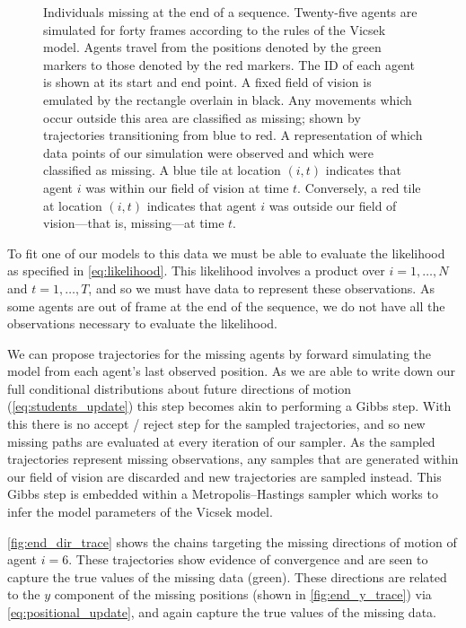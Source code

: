 \begin{figure}[tbp]
\begin{subfigure}[b]{0.5\textwidth}
    \caption{}
    \label{subfig:end_missing}
  \end{subfigure}
  \caption{Individuals missing at the end of a sequence.
   Twenty-five agents are simulated for forty frames
  according to the rules of the Vicsek model. Agents travel from the positions
  denoted by the green markers to those denoted by the red markers. The ID of
  each agent is shown at its start and end point. A fixed field of vision is
  emulated by the rectangle overlain in black. Any movements which occur
  outside this area are classified as missing; shown by trajectories
  transitioning from blue to red.
   A representation of which data points of our
  simulation were observed and which were classified as missing. A blue tile at
  location $(i, t)$ indicates that agent $i$ was within our field of vision at
  time $t$. Conversely, a red tile at location $(i, t)$ indicates that agent
  $i$ was outside our field of vision---that is, missing---at time $t$.}
  \label{fig:end_data}
\end{figure}

To fit one of our models to this data we must be able to evaluate the
likelihood as specified in \cref{eq:likelihood}. This likelihood involves a
product over $i=1,\ldots,N$ and $t=1,\ldots,T$, and so we must have data to
represent these observations. As some agents are out of frame at the end of the
sequence, we do not have all the observations necessary to evaluate the
likelihood.

We can propose trajectories for the missing agents by forward simulating the
model from each agent's last observed position. As we are able to write down
our full conditional distributions about future directions of motion
(\cref{eq:students_update}) this step becomes akin to performing a Gibbs step.
With this there is no accept / reject step for the sampled trajectories, and so
new missing paths are evaluated at every iteration of our sampler. As the
sampled trajectories represent missing observations, any samples that are
generated within our field of vision are discarded and new trajectories are
sampled instead. This Gibbs step is embedded within a Metropolis--Hastings
sampler which works to infer the model parameters of the Vicsek model.

\cref{fig:end_dir_trace} shows the chains targeting the missing directions of
motion of agent $i=6$. These trajectories show evidence of convergence and are
seen to capture the true values of the missing data (green). These directions
are related to the $y$ component of the missing positions (shown in
\cref{fig:end_y_trace}) via \cref{eq:positional_update}, and again capture the
true values of the missing data.

